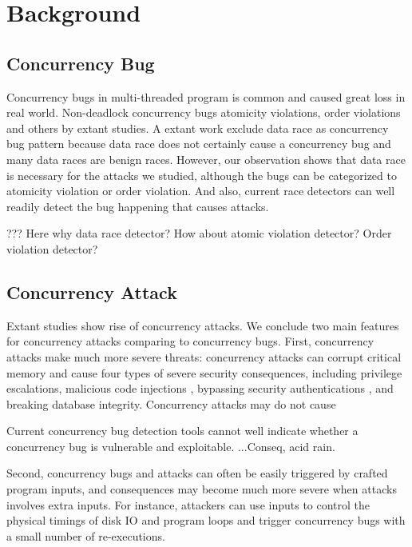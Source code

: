 \section{Background}\label{sec:background}

\subsection{Concurrency Bug}

Concurrency bugs in multi-threaded program is common and caused great loss in real world. 
Non-deadlock concurrency bugs 
atomicity violations\cite{}, order violations\cite{} and others by extant studies\cite{lu:concurrency-bugs,conmem:asplos10}. 
A extant work exclude data race as concurrency bug pattern 
because data race does not certainly cause a concurrency bug\cite{lu:concurrency-bugs} and many data races are benign races. 
However, our observation shows that data race is necessary for the attacks we studied, 
although the bugs can be categorized to atomicity violation or order violation. 
And also, current race detectors can well readily detect the bug happening that causes attacks.

??? Here why data race detector? How about atomic violation detector? Order violation detector?
 
\subsection{Concurrency Attack}
Extant studies \cite{con:hotpar12, acidrain:sigmod17} show rise of concurrency 
attacks. We conclude two main features for concurrency attacks comparing to concurrency bugs. 
First, concurrency attacks make much more severe threats:
concurrency attacks can corrupt critical memory and cause four
types of severe security consequences, including privilege escalations\cite{uselib-bug-12791, mysql-bug-24988},
malicious code injections \cite{msiexploit},  
bypassing security authentications\cite{cve-2010-0923, cve-2008-0034, cve-2010-1754}
, and breaking database integrity\cite{acidrain:sigmod17}. 
Concurrency attacks may do not cause 

Current concurrency bug detection tools cannot well indicate whether a concurrency bug is vulnerable and exploitable.
...Conseq, acid rain.

Second, concurrency bugs and attacks can often be easily
triggered by crafted program inputs, and consequences may 
become much more severe when attacks involves extra inputs.  
For instance, attackers
can use inputs to control the physical timings of disk
IO and program loops and trigger concurrency bugs with a
small number of re-executions. 

